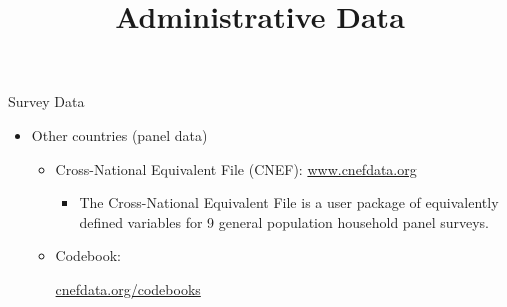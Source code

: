 \documentclass[hyperref={pdfpagelabels=false}]{beamer}
\begin{document}
\begin{frame}{Survey Data}
	\begin{itemize} 
		\item Other countries (panel data)
		\vspace{0.3cm}
		\begin{itemize} 
			\item Cross-National Equivalent File (CNEF): \href{https://www.cnefdata.org/about/about-cnef}{www.cnefdata.org}
					\vspace{0.3cm}
			\begin{itemize} 
			\item The Cross-National Equivalent File is a user package of equivalently defined variables for 9 general population household panel surveys.
			  		\end{itemize}
		   					\vspace{0.3cm}
		   \item Codebook:
		   
		   		\href{https://www.cnefdata.org/documentation/codebooks}{cnefdata.org/codebooks}
		  		
		  		
		\end{itemize}
		
	\end{itemize}
\end{frame}







\title[]  
{Administrative Data}


\author 
{}

\institute{}






\date
{}


\begin{frame}{}
	\titlepage
\end{frame}
\end{document}
